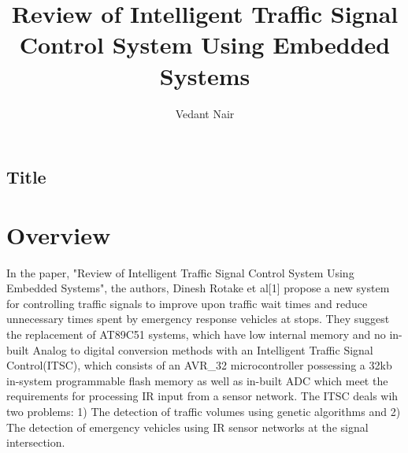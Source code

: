 
\title{Review of Intelligent Traffic Signal Control System Using Embedded Systems}
\author{Vedant Nair}
\date{\tody}


	
	\begin{center}
		\section*{Title}
	\end{center}
\setlength{\columnsep}{1.0cm}
	\section*{Overview}
	In the paper, "Review of Intelligent Traffic Signal Control System Using Embedded Systems", the authors, Dinesh Rotake et al[1] propose a new system for controlling traffic signals to improve upon traffic wait times and reduce unnecessary times spent by emergency response vehicles at stops. They suggest the replacement of AT89C51 systems, which have low internal memory and no in-built Analog to digital conversion methods with an Intelligent Traffic Signal Control(ITSC), which  consists of an AVR_32 microcontroller possessing a 32kb in-system programmable flash memory as well as in-built ADC which meet the requirements for processing IR input from a sensor network. The ITSC deals wih two problems: 1) The detection of traffic volumes using genetic algorithms and 2) The detection of emergency vehicles using IR sensor networks at the signal intersection.
